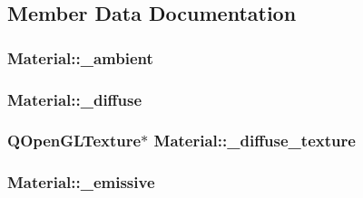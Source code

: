 \subsection{Member Data Documentation}
\hypertarget{class_material_a8631fe4ccaea32b5f83d618490ed1a94}{
\subsubsection[{\+\_\+ambient}]{ Material\+::\+\_\+ambient\hspace{0.3cm}{\ttfamily [private]}}}\label{class_material_a8631fe4ccaea32b5f83d618490ed1a94}
\hypertarget{class_material_ac6d5a21fb938c37d981ff904baa139ce}{
\subsubsection[{\+\_\+diffuse}]{ Material\+::\+\_\+diffuse\hspace{0.3cm}{\ttfamily [private]}}}\label{class_material_ac6d5a21fb938c37d981ff904baa139ce}
\hypertarget{class_material_a522d07896a1363e987d09d8e4b66c156}{
\subsubsection[{\+\_\+diffuse\+\_\+texture}]{\setlength{\rightskip}{0pt plus 5cm}Q\+Open\+G\+L\+Texture$\ast$ Material\+::\+\_\+diffuse\+\_\+texture\hspace{0.3cm}{\ttfamily [private]}}}\label{class_material_a522d07896a1363e987d09d8e4b66c156}
\hypertarget{class_material_a48f498add75d2e7b0022b3f34271e22b}{
\subsubsection[{\+\_\+emissive}]{ Material\+::\+\_\+emissive\hspace{0.3cm}{\ttfamily [private]}}}\label{class_material_a48f498add75d2e7b0022b3f34271e22b}
